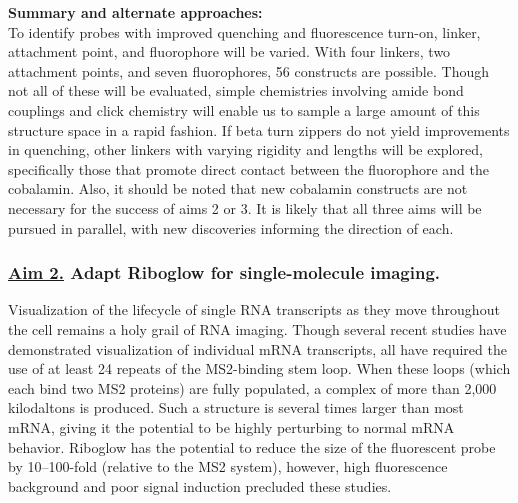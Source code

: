 \textbf{Summary and alternate approaches:}\\
To identify probes with improved quenching and fluorescence turn-on, linker, attachment point, and fluorophore will be varied. With four linkers, two attachment points, and seven fluorophores, 56 constructs are possible. Though not all of these will be evaluated, simple chemistries involving amide bond couplings and click chemistry will enable us to sample a large amount of this structure space in a rapid fashion. If beta turn zippers do not yield improvements in quenching, other linkers with varying rigidity and lengths will be explored\cite{LeeDesignSynthesisCharacterization2009}, specifically those that promote direct contact between the fluorophore and the cobalamin. Also, it should be noted that new cobalamin constructs are not necessary for the success of aims 2 or 3. It is likely that all three aims will be pursued in parallel, with new discoveries informing the direction of each.

\subsubsection*{\underline{Aim 2.} Adapt Riboglow for single-molecule imaging.}
Visualization of the lifecycle of single RNA transcripts as they move throughout the cell remains a holy grail of RNA imaging.\cite{LiCentraldogmasinglemolecule2011} Though several recent studies have demonstrated visualization of individual mRNA transcripts, all have required the use of at least 24 repeats of the MS2-binding stem loop\cite{KatzMappingtranslationhotspots2016,FuscoSinglemRNAMolecules2003,YamagishiSinglemoleculeimagingvactin2009,HalsteadRNAbiosensorimaging2015}.
When these loops (which each bind two MS2 proteins) are fully populated, a complex of more than 2,000 kilodaltons is produced.
Such a structure is several times larger than most mRNA, giving it the potential to be highly perturbing to normal mRNA behavior.
Riboglow has the potential to reduce the size of the fluorescent probe by 10--100-fold (relative to the MS2 system), however, high fluorescence background and poor signal induction precluded these studies\cite{BraselmannDevelopmentriboswitchbasedplatform2017}.


